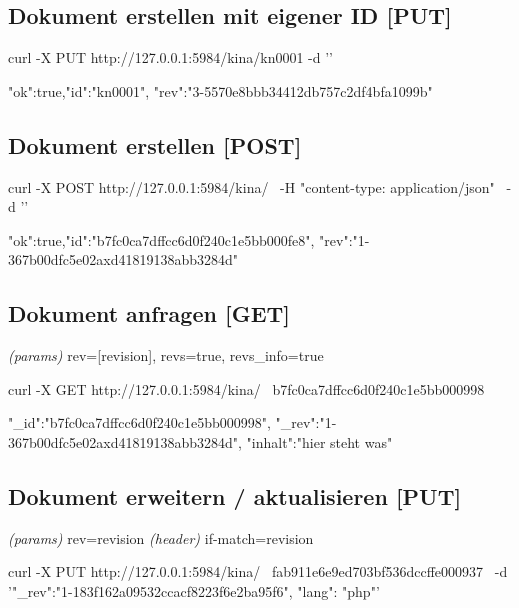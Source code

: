 \documentclass[19pt,landscape,twocolumn]{article}
\newcommand{\htmlverb}[1]{{[}\textbf{{#1}}{]}}
\newcommand{\setparskip}{\setlength{\parskip}{-6mm}}
\newcommand{\resetparskip}{\setlength{\parskip}{1mm}}
\begin{document}
\subsection{Dokument erstellen mit eigener ID \htmlverb{PUT}}

\begin{code}
curl -X PUT http://127.0.0.1:5984/kina/kn0001 -d '{}'
\end{code}
\setparskip
\begin{response}
{"ok":true,"id":"kn0001",
 "rev":"3-5570e8bbb34412db757c2df4bfa1099b"}
\end{response}
\resetparskip

\subsection{Dokument erstellen \htmlverb{POST}}

\begin{code}
curl -X POST http://127.0.0.1:5984/kina/ \
     -H "content-type: application/json" \
     -d '{}'
\end{code}
\setparskip
\begin{response}
{"ok":true,"id":"b7fc0ca7dffcc6d0f240c1e5bb000fe8",
 "rev":"1-367b00dfc5e02axd41819138abb3284d"}
\end{response}
\resetparskip

\subsection{Dokument anfragen \htmlverb{GET}}
\emph{(params)} rev={[}revision{]}, revs=true, revs\_info=true

\begin{code}
curl -X GET http://127.0.0.1:5984/kina/ \
  b7fc0ca7dffcc6d0f240c1e5bb000998
\end{code}
\setparskip
\begin{response}
{"_id":"b7fc0ca7dffcc6d0f240c1e5bb000998",
 "_rev":"1-367b00dfc5e02axd41819138abb3284d",
 "inhalt":"hier steht was"}
\end{response}
\resetparskip

\subsection{Dokument erweitern / aktualisieren \htmlverb{PUT}}
\emph{(params)} rev=revision \newline
\emph{(header)} if-match=revision

\begin{code}
curl -X PUT http://127.0.0.1:5984/kina/ \
  fab911e6e9ed703bf536dccffe000937 \
     -d '{"_rev":"1-183f162a09532ccacf8223f6e2ba95f6",
          "lang": "php"}'
\end{code}
\end{document}
